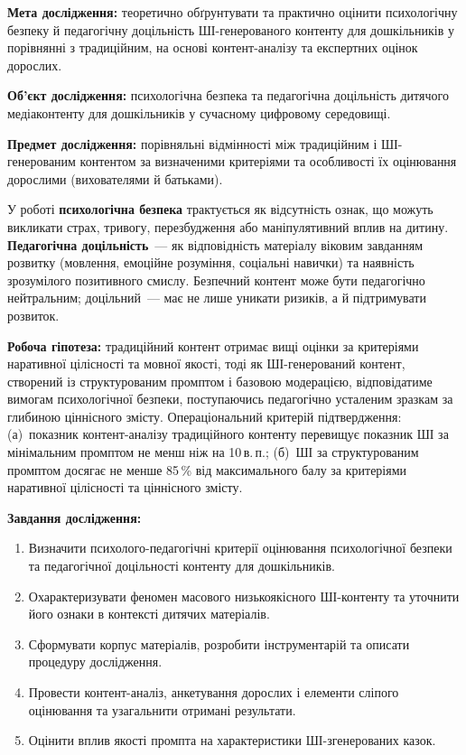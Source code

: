 \documentclass[14pt, a4paper]{extreport}
\begin{document}
\textbf{Мета дослідження:} теоретично обґрунтувати та практично оцінити психологічну безпеку й педагогічну доцільність ШІ-генерованого контенту для дошкільників у порівнянні з традиційним, на основі контент-аналізу та експертних оцінок дорослих.

\textbf{Об'єкт дослідження:} психологічна безпека та педагогічна доцільність дитячого медіаконтенту для дошкільників у сучасному цифровому середовищі.

\textbf{Предмет дослідження:} порівняльні відмінності між традиційним і ШІ-генерованим контентом за визначеними критеріями та особливості їх оцінювання дорослими (вихователями й батьками).

У роботі \textbf{психологічна безпека} трактується як відсутність ознак, що можуть викликати страх, тривогу, перезбудження або маніпулятивний вплив на дитину. \textbf{Педагогічна доцільність}~--- як відповідність матеріалу віковим завданням розвитку (мовлення, емоційне розуміння, соціальні навички) та наявність зрозумілого позитивного смислу. Безпечний контент може бути педагогічно нейтральним; доцільний~--- має не лише уникати ризиків, а й підтримувати розвиток.

\textbf{Робоча гіпотеза:} традиційний контент отримає вищі оцінки за критеріями наративної цілісності та мовної якості, тоді як ШІ-генерований контент, створений із структурованим промптом і базовою модерацією, відповідатиме вимогам психологічної безпеки, поступаючись педагогічно усталеним зразкам за глибиною ціннісного змісту. Операціональний критерій підтвердження: (а)~показник контент-аналізу традиційного контенту перевищує показник ШІ за мінімальним промптом не менш ніж на 10\,в.\,п.; (б)~ШІ за структурованим промптом досягає не менше 85\,\% від максимального балу за критеріями наративної цілісності та ціннісного змісту.

\textbf{Завдання дослідження:}
\begin{enumerate}
  \item Визначити психолого-педагогічні критерії оцінювання психологічної безпеки та педагогічної доцільності контенту для дошкільників.
  \item Охарактеризувати феномен масового низькоякісного ШІ-контенту та уточнити його ознаки в контексті дитячих матеріалів.
  \item Сформувати корпус матеріалів, розробити інструментарій та описати процедуру дослідження.
  \item Провести контент-аналіз, анкетування дорослих і елементи сліпого оцінювання та узагальнити отримані результати.
  \item Оцінити вплив якості промпта на характеристики ШІ-згенерованих казок.
\end{enumerate}
\end{document}
